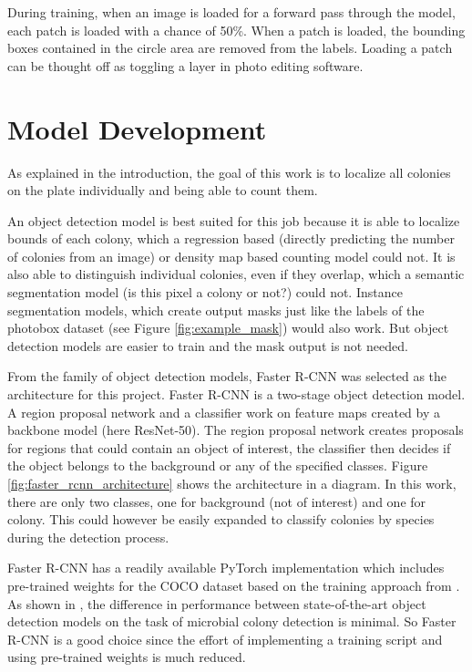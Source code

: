 During training, when an image is loaded for a forward pass through the model, each patch is loaded with a chance of 50\%. When a patch is loaded, the bounding boxes contained in the circle area are removed from the labels. Loading a patch can be thought off as toggling a layer in photo editing software.

\section{Model Development}

As explained in the introduction, the goal of this work is to localize all colonies on the plate individually and being able to count them. 

An object detection model is best suited for this job because it is able to localize bounds of each colony, which a regression based (directly predicting the number of colonies from an image) or density map based counting model could not. It is also able to distinguish individual colonies, even if they overlap, which a semantic segmentation model (is this pixel a colony or not?) could not. Instance segmentation models, which create output masks just like the labels of the photobox dataset (see Figure \ref{fig:example_mask}) would also work. But object detection models are easier to train and the mask output is not needed.

From the family of object detection models, Faster R-CNN was selected as the architecture for this project. Faster R-CNN is a two-stage object detection model. A region proposal network and a classifier work on feature maps created by a backbone model (here ResNet-50). The region proposal network creates proposals for regions that could contain an object of interest, the classifier then decides if the object belongs to the background or any of the specified classes. \cite{ren2016faster} Figure \ref{fig:faster_rcnn_architecture} shows the architecture in a diagram. In this work, there are only two classes, one for background (not of interest) and one for colony. This could however be easily expanded to classify colonies by species during the detection process.

Faster R-CNN has a readily available PyTorch implementation \cite{PyTorchVision_FasterRCNN} which includes pre-trained weights for the COCO dataset based on the training approach from \citet{li2021benchmarking}. As shown in \citet{Majchrowska_2022}, the difference in performance between state-of-the-art object detection models on the task of microbial colony detection is minimal. So Faster R-CNN is a good choice since the effort of implementing a training script \cite{torchvisiontutorial} and using pre-trained weights \cite{fasterrcnnweights} is much reduced.

